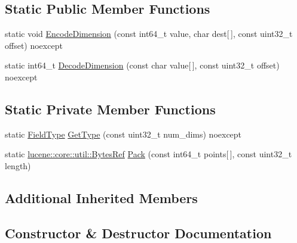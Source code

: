 \subsection*{Static Public Member Functions}
\begin{DoxyCompactItemize}
\item 
static void \mbox{\hyperlink{classlucene_1_1core_1_1document_1_1LongPoint_a80f6cff17fd7eb5d8664650dda0174b0}{Encode\+Dimension}} (const int64\+\_\+t value, char dest\mbox{[}$\,$\mbox{]}, const uint32\+\_\+t offset) noexcept
\item 
static int64\+\_\+t \mbox{\hyperlink{classlucene_1_1core_1_1document_1_1LongPoint_ac98e9a6a591c5ed127d1330e2f5d5114}{Decode\+Dimension}} (const char value\mbox{[}$\,$\mbox{]}, const uint32\+\_\+t offset) noexcept
\end{DoxyCompactItemize}
\subsection*{Static Private Member Functions}
\begin{DoxyCompactItemize}
\item 
static \mbox{\hyperlink{classlucene_1_1core_1_1document_1_1FieldType}{Field\+Type}} \mbox{\hyperlink{classlucene_1_1core_1_1document_1_1LongPoint_a5c411f51ac0f3dbce1df139d3a4c1973}{Get\+Type}} (const uint32\+\_\+t num\+\_\+dims) noexcept
\item 
static \mbox{\hyperlink{classlucene_1_1core_1_1util_1_1BytesRef}{lucene\+::core\+::util\+::\+Bytes\+Ref}} \mbox{\hyperlink{classlucene_1_1core_1_1document_1_1LongPoint_ae106b6585f35417b63c6f1f3aaeb1b93}{Pack}} (const int64\+\_\+t points\mbox{[}$\,$\mbox{]}, const uint32\+\_\+t length)
\end{DoxyCompactItemize}
\subsection*{Additional Inherited Members}


\subsection{Constructor \& Destructor Documentation}
\mbox{\label{classlucene_1_1core_1_1document_1_1LongPoint_afafac70472560f4063bc11afe18be5c7}} 
